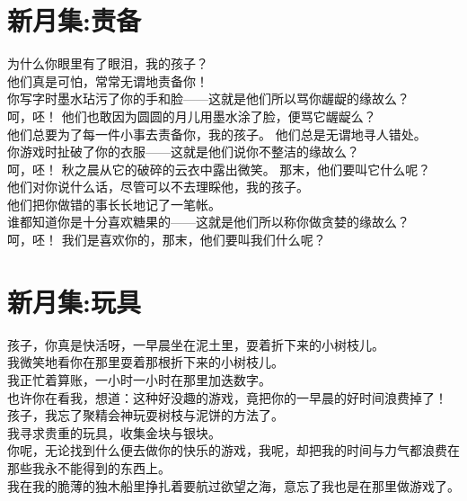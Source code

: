 \documentclass[
]{book}
\renewenvironment{quote}{\begin{VF}}{\end{VF}}
\begin{document}
\hypertarget{section-37}{%
\section{新月集:责备}\label{section-37}}

\begin{quote}
为什么你眼里有了眼泪，我的孩子？\\
他们真是可怕，常常无谓地责备你！\\
你写字时墨水玷污了你的手和脸------这就是他们所以骂你龌龊的缘故么？\\
呵，呸！ 他们也敢因为圆圆的月儿用墨水涂了脸，便骂它龌龊么？\\
他们总要为了每一件小事去责备你，我的孩子。 他们总是无谓地寻人错处。\\
你游戏时扯破了你的衣服------这就是他们说你不整洁的缘故么？\\
呵，呸！ 秋之晨从它的破碎的云衣中露出微笑。 那末，他们要叫它什么呢？\\
他们对你说什么话，尽管可以不去理睬他，我的孩子。\\
他们把你做错的事长长地记了一笔帐。\\
谁都知道你是十分喜欢糖果的------这就是他们所以称你做贪婪的缘故么？\\
呵，呸！ 我们是喜欢你的，那末，他们要叫我们什么呢？
\end{quote}

\hypertarget{section-38}{%
\section{新月集:玩具}\label{section-38}}

\begin{quote}
孩子，你真是快活呀，一早晨坐在泥土里，耍着折下来的小树枝儿。\\
我微笑地看你在那里耍着那根折下来的小树枝儿。\\
我正忙着算账，一小时一小时在那里加迭数字。\\
也许你在看我，想道：这种好没趣的游戏，竟把你的一早晨的好时间浪费掉了！\\
孩子，我忘了聚精会神玩耍树枝与泥饼的方法了。\\
我寻求贵重的玩具，收集金块与银块。\\
你呢，无论找到什么便去做你的快乐的游戏，我呢，却把我的时间与力气都浪费在那些我永不能得到的东西上。\\
我在我的脆薄的独木船里挣扎着要航过欲望之海，意忘了我也是在那里做游戏了。
\end{quote}
\end{document}
